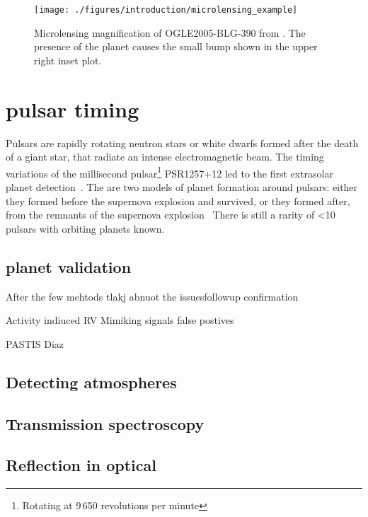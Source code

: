 
\begin{figure}
\texttt{[image: ./figures/introduction/microlensing\_example]} 
\caption{Microlensing magnification of OGLE2005-BLG-390 from 
    \citep{beaulieu_discovery_2006}. The presence of the planet causes the small bump shown in the upper right inset plot. }
\label{fig:microlensing_example}
\end{figure}



\section{pulsar timing}

Pulsars are rapidly rotating neutron stars or white dwarfs formed after the death of a giant star, that radiate an intense electromagnetic beam. The timing variations of the millisecond pulsar\footnote{Rotating at 9\,650 revolutions per minute} PSR1257+12 led to the first extrasolar planet detection~\citet{wolszczan_planetary_1992}. The are two models of planet formation around pulsars: either they formed before the supernova explosion and survived, or they formed after, from the remnants of the supernova explosion~\citep{Starovoit_existence_2017}
There is still a rarity of  <10 pulsars with orbiting planets known.


\subsection{planet validation}
After the few mehtods tlakj abnuot the issuesfollowup confirmation

Activity indiuced RV
Mimiking signals false postives

PASTIS Diaz



\subsection{Detecting atmospheres}

\subsection{Transmission spectroscopy}

\subsection{Reflection in optical}

